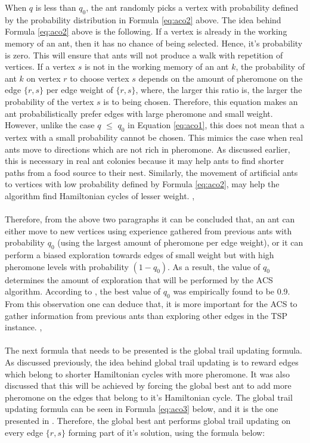 \documentclass[12pt]{article}
\numberwithin{equation}{subsection}
\numberwithin{table}{subsection}
\numberwithin{algorithm}{subsection}
\numberwithin{figure}{subsection}
\begin{document}
When $q$ is less than $q_0$, the ant randomly picks a vertex with probability defined by the probability distribution in Formula \ref{eq:aco2} above. The idea behind Formula \ref{eq:aco2} above is the following. If a vertex is already in the working memory of an ant, then it has no chance of being selected. Hence, it's probability is zero. This will ensure that ants will not produce a walk with repetition of vertices. If a vertex $s$ is not in the working memory of an ant $k$, the probability of ant $k$ on vertex $r$ to choose vertex $s$ depends on the amount of pheromone on the edge $\{r,s\}$ per edge weight of $\{r,s\}$, where, the larger this ratio is, the larger the probability of the vertex $s$ is to being chosen. Therefore, this equation makes an ant probabilistically prefer edges with large pheromone and small weight. However, unlike the case $q$ $\leq$ $q_0$ in Equation \ref{eq:aco1}, this does not mean that a vertex with a small probability cannot be chosen. This mimics the case when real ants move to directions which are not rich in pheromone. As discussed earlier, this is necessary in real ant colonies because it may help ants to find shorter paths from a food source to their nest. Similarly, the movement of artificial ants to vertices with low probability defined by Formula \ref{eq:aco2}, may help the algorithm find Hamiltonian cycles of lesser weight. \cite{dorigo_gambardella_1997}, \cite{dorigo_stutzle_thomas_2004}\\\\
Therefore, from the above two paragraphs it can be concluded that, an ant can either move to new vertices using experience gathered from previous ants with probability $q_0$ (using the largest amount of pheromone per edge weight), or it can perform a biased exploration towards edges of small weight but with high pheromone levels with probability $(1-q_0)$. As a result, the value of $q_0$ determines the amount of exploration that will be performed by the ACS algorithm. According to  \cite{dorigo_gambardella_1997}, the best value of $q_0$ was empirically found to be 0.9. From this observation one can deduce that, it is more important for the ACS to gather information from previous ants than exploring other edges in the TSP instance. \cite{dorigo_gambardella_1997}, \cite{dorigo_stutzle_thomas_2004}\\\\
The next formula that needs to be presented is the global trail updating formula. As discussed previously, the idea behind global trail updating is to reward edges which belong to shorter Hamiltonian cycles with more pheromone. It was also discussed that this will be achieved by forcing the global best ant to add more pheromone on the edges that belong to it's Hamiltonian cycle. The global trail updating formula can be seen in Formula \ref{eq:aco3} below, and it is the one presented in \cite{dorigo_stutzle_thomas_2004}. Therefore, the global best ant performs global trail updating on every edge $\{r,s\}$ forming part of it's solution, using the formula below:
\end{document}
